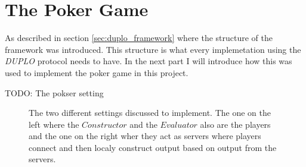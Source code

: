\documentclass[twoside,11pt,openright]{report}
\newcommand{\todo}[1]{}
\renewcommand{\todo}[1]{{\color{red} TODO: {#1}} \\}
\newcommand{\DUPLO}{\textit{DUPLO} }
\begin{document}
\section{The Poker Game}
As described in section \ref{sec:duplo_framework} where the structure of the framework was introduced. This structure is what every implemetation using the \DUPLO protocol needs to have. In the next part I will introduce how this was used to implement the poker game in this project.

\bigskip

\todo{The pokser setting}
\begin{figure}
\centering

\caption{The two different settings discussed to implement. The one on the left where the $Constructor$ and the $Evaluator$ also are the players and the one on the right wher they act as servers where players connect and then localy construct output based on output from the servers.}
\label{fig:poker_setting}
\end{figure}
\end{document}

